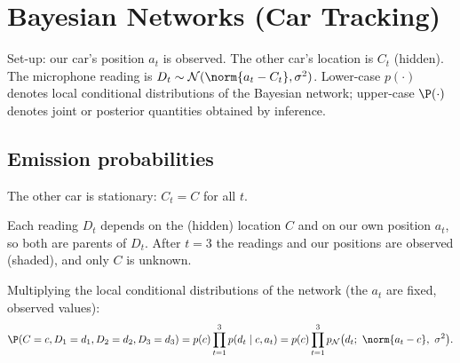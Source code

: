 \section{Bayesian Networks (Car Tracking)}
\label{sec:bayesian}

Set-up: our car's position $a_t$ is observed. The other car's location is $C_t$ (hidden). The microphone reading
is $D_t\sim\mathcal N(\norm{a_t-C_t},\sigma^2)$. Lower-case $p(\cdot)$ denotes local conditional distributions
of the Bayesian network; upper-case $\P(\cdot)$ denotes joint or posterior quantities obtained by inference.

\subsection{Emission probabilities}
The other car is stationary: $C_t=C$ for all $t$.

\begin{solution}
Each reading $D_t$ depends on the (hidden) location $C$ and on our own position $a_t$, so both are parents of
$D_t$. After $t=3$ the readings and our positions are observed (shaded), and only $C$ is unknown.
\begin{center}
\end{center}
\end{solution}

\begin{solution}
Multiplying the local conditional distributions of the network (the $a_t$ are fixed, observed values):
\[
\P(C=c,D_1=d_1,D_2=d_2,D_3=d_3)=p(c)\prod_{t=1}^{3}p(d_t\mid c,a_t)
=p(c)\prod_{t=1}^{3}p_{\mathcal N}\bigl(d_t;\ \norm{a_t-c},\ \sigma^2\bigr).
\]
\end{solution}


